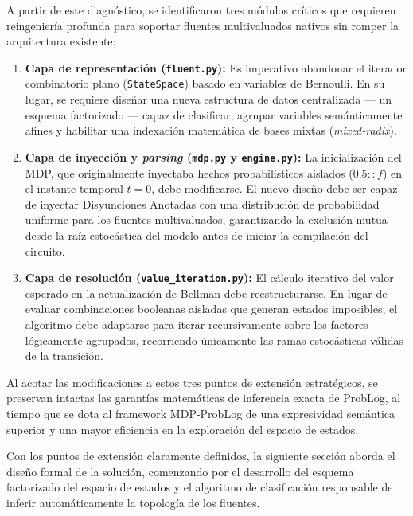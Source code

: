 A partir de este diagnóstico, se identificaron tres módulos críticos que requieren reingeniería profunda para soportar fluentes multivaluados nativos sin romper la arquitectura existente:

\begin{enumerate}
    \item \textbf{Capa de representación (\texttt{fluent.py}):} Es imperativo abandonar el iterador combinatorio plano (\texttt{StateSpace}) basado en variables de Bernoulli. En su lugar, se requiere diseñar una nueva estructura de datos centralizada --- un esquema factorizado --- capaz de clasificar, agrupar variables semánticamente afines y habilitar una indexación matemática de bases mixtas (\textit{mixed-radix}).
    
    \item \textbf{Capa de inyección y \textit{parsing} (\texttt{mdp.py} y \texttt{engine.py}):} La inicialización del MDP, que originalmente inyectaba hechos probabilísticos aislados ($0.5::f$) en el instante temporal $t=0$, debe modificarse. El nuevo diseño debe ser capaz de inyectar Disyunciones Anotadas con una distribución de probabilidad uniforme para los fluentes multivaluados, garantizando la exclusión mutua desde la raíz estocástica del modelo antes de iniciar la compilación del circuito.
    
    \item \textbf{Capa de resolución (\texttt{value\_iteration.py}):} El cálculo iterativo del valor esperado en la actualización de Bellman debe reestructurarse. En lugar de evaluar combinaciones booleanas aisladas que generan estados imposibles, el algoritmo debe adaptarse para iterar recursivamente sobre los factores lógicamente agrupados, recorriendo únicamente las ramas estocásticas válidas de la transición.
\end{enumerate}

Al acotar las modificaciones a estos tres puntos de extensión estratégicos, se preservan intactas las garantías matemáticas de inferencia exacta de ProbLog, al tiempo que se dota al framework MDP-ProbLog de una expresividad semántica superior y una mayor eficiencia en la exploración del espacio de estados. 

Con los puntos de extensión claramente definidos, la siguiente sección aborda el diseño formal de la solución, comenzando por el desarrollo del esquema factorizado del espacio de estados y el algoritmo de clasificación responsable de inferir automáticamente la topología de los fluentes.

